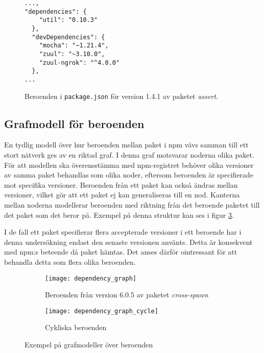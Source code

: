 \lstset{language=Java}
\begin{figure}[h]
  \center
  \begin{minipage}[c]{5cm}
    \begin{lstlisting}
...,
"dependencies": {
    "util": "0.10.3"
  },
  "devDependencies": {
    "mocha": "~1.21.4",
    "zuul": "~3.10.0",
    "zuul-ngrok": "^4.0.0"
  },
...
    \end{lstlisting}
  \end{minipage}
  \caption{Beroenden i \texttt{package.json} för version 1.4.1 av paketet \textit{assert}.\cite{npm-assert}}
  \label{fig:package.json}
\end{figure}

\subsection{Grafmodell för beroenden}
En tydlig modell över hur beroenden mellan paket i npm vävs samman till ett stort nätverk ges av en riktad graf. I denna graf motsvarar noderna olika paket. För att modellen ska överensstämma med npm-registret behöver olika versioner av samma paket behandlas som olika noder, eftersom beroenden är specifierade mot specifika versioner. Beroenden från ett paket kan också ändras mellan versioner, vilket gör att ett paket ej kan generaliseras till en nod. Kanterna mellan noderna modellerar beroenden med riktning från det beroende paketet till det paket som det beror på. Exempel på denna struktur kan ses i figur \ref{fig:beroende-graf-cykel}.

I de fall ett paket specifierar flera accepterade versioner i ett beroende har i denna undersökning endast den senaste versionen använts. Detta är konsekvent med npm:s beteende då paket hämtas. Det anses därför ointressant för att behandla detta som flera olika beroenden.

\begin{figure}
  \captionsetup{justification=centering}
  \centering
  \begin{subfigure}[t]{.5\textwidth}
    \begin{minipage}[t][8cm][b]{0,5\textwidth}
      \vspace*{\fill}
        \texttt{[image: dependency\_graph]}
      \vspace*{\fill}
    \end{minipage}
    \caption{Beroenden från version 6.0.5 av paketet \textit{cross-spawn}}
    \label{fig:beroende-graf}
  \end{subfigure}%
  \begin{subfigure}[t]{.5\textwidth}
    \begin{minipage}[t][8cm][b]{0,5\textwidth}
      \vspace*{\fill}
      \texttt{[image: dependency\_graph\_cycle]}
      \vspace*{\fill}
    \end{minipage}
    \caption{Cykliska beroenden}
    \label{fig:beroende-graf-cykel}
  \end{subfigure}
  \caption{Exempel på grafmodeller över beroenden}
  \label{fig:grafmodell}
\end{figure}

